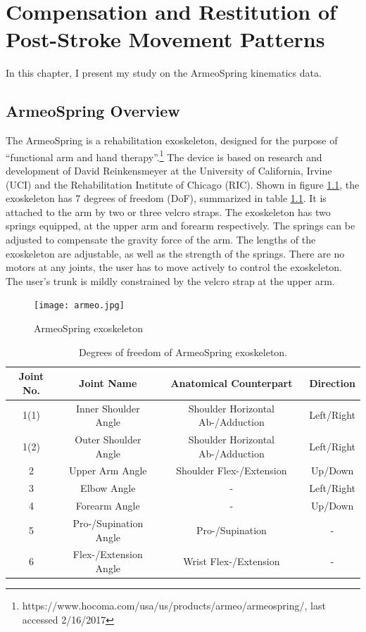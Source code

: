 \chapter{Compensation and Restitution of Post-Stroke Movement Patterns}
\label{cha:armeospring}

In this chapter, I present my study on the ArmeoSpring kinematics data.

\section{ArmeoSpring Overview}
\label{sec:overview}

The ArmeoSpring is a rehabilitation exoskeleton, designed for the purpose of ``functional arm and hand therapy''.\footnote{\label{aowebsite}https://www.hocoma.com/usa/us/products/armeo/armeospring/, last accessed 2/16/2017} 
The device is based on research and development of David Reinkensmeyer at the University of California, Irvine (UCI) and the Rehabilitation Institute of Chicago (RIC). 
Shown in figure \ref{fig:armeo}, the exoskeleton has 7 degrees of freedom (DoF), summarized in table \ref{tab:devicedof}. 
It is attached to the arm by two or three velcro straps. 
The exoskeleton has two springs equipped, at the upper arm and forearm respectively. 
The springs can be adjusted to compensate the gravity force of the arm. 
The lengths of the exoskeleton are adjustable, as well as the strength of the springs. 
There are no motors at any joints, the user has to move actively to control the exoskeleton. 
The user's trunk is mildly constrained by the velcro strap at the upper arm. 

\begin{figure}
	\texttt{[image: armeo.jpg]}
	\centering
	\caption{ArmeoSpring exoskeleton}
	\label{fig:armeo}
\end{figure}

\begin{table}
	\begin{tabular}{c c c c}
	\hline
	Joint No. & Joint Name & Anatomical Counterpart & Direction \\
	\hline
	1(1) & Inner Shoulder Angle & Shoulder Horizontal Ab-/Adduction & Left/Right \\
	1(2) & Outer Shoulder Angle & Shoulder Horizontal Ab-/Adduction & Left/Right \\
	2 & Upper Arm Angle & Shoulder Flex-/Extension & Up/Down \\
	3 & Elbow Angle & - & Left/Right \\
	4 & Forearm Angle & - & Up/Down \\
	5 & Pro-/Supination Angle & Pro-/Supination & - \\ 
	6 & Flex-/Extension Angle & Wrist Flex-/Extension & - \\
	\hline
	\end{tabular}
	\caption{Degrees of freedom of ArmeoSpring exoskeleton.}
	\label{tab:devicedof}
\end{table}

